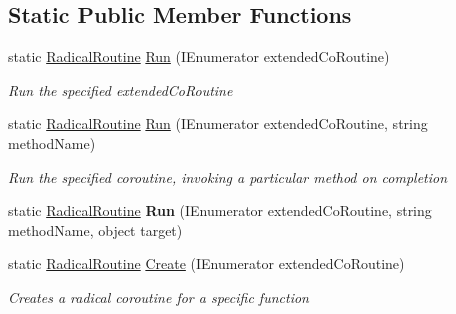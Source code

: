 \subsection*{Static Public Member Functions}
\begin{DoxyCompactItemize}
\item 
static \hyperlink{class_radical_routine}{Radical\+Routine} \hyperlink{class_radical_routine_a548acf1cd3335a543c8014a87d2fa26b}{Run} (I\+Enumerator extended\+Co\+Routine)
\begin{DoxyCompactList}\small\item\em Run the specified extended\+Co\+Routine \end{DoxyCompactList}\item 
static \hyperlink{class_radical_routine}{Radical\+Routine} \hyperlink{class_radical_routine_ac64373a158f06b92f5d1c0052a49c3b6}{Run} (I\+Enumerator extended\+Co\+Routine, string method\+Name)
\begin{DoxyCompactList}\small\item\em Run the specified coroutine, invoking a particular method on completion \end{DoxyCompactList}\item 
\mbox{\label{class_radical_routine_a569f25f7a79cec6bee8998d2927e1de2}} 
static \hyperlink{class_radical_routine}{Radical\+Routine} {\bfseries Run} (I\+Enumerator extended\+Co\+Routine, string method\+Name, object target)
\item 
static \hyperlink{class_radical_routine}{Radical\+Routine} \hyperlink{class_radical_routine_ac6e7a37c8a2b76dde3bbaf486faffd4b}{Create} (I\+Enumerator extended\+Co\+Routine)
\begin{DoxyCompactList}\small\item\em Creates a radical coroutine for a specific function \end{DoxyCompactList}\end{DoxyCompactItemize}
